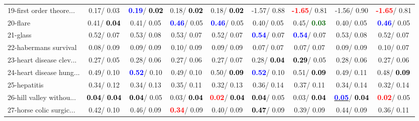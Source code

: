 \begin{table}[h]
\begin{center}
\begin{tabular}{lc|c|c|c|c|c|c|c}
19-first order theore... &   0.17/  0.03 & \textcolor{blue}{\textbf{  0.19}}/\textcolor{black}{\textbf{  0.02}} &   0.18/\textcolor{black}{\textbf{  0.02}} &   0.18/\textcolor{black}{\textbf{  0.02}} &  -1.57/  0.88 & \textcolor{red}{\textbf{ -1.65}}/  0.81 &  -1.56/  0.90 & \textcolor{red}{\textbf{ -1.65}}/  0.81 \\
20-flare &   0.41/\textcolor{black}{\textbf{  0.04}} &   0.41/  0.05 & \textcolor{blue}{\textbf{  0.46}}/  0.05 & \textcolor{blue}{\textbf{  0.46}}/  0.05 &   0.40/  0.05 &   0.45/\textcolor{darkgreen}{\textbf{  0.03}} &   0.40/  0.05 & \textcolor{blue}{\textbf{  0.46}}/  0.05 \\
21-glass &   0.52/  0.07 &   0.53/  0.08 &   0.53/  0.07 &   0.52/  0.07 & \textcolor{blue}{\textbf{  0.54}}/  0.07 & \textcolor{blue}{\textbf{  0.54}}/  0.07 &   0.53/  0.08 &   0.52/  0.07 \\ \hline
22-habermans survival &   0.08/  0.09 &   0.09/  0.09 &   0.10/  0.09 &   0.09/  0.09 &   0.07/  0.07 &   0.07/  0.07 &   0.09/  0.09 &   0.10/  0.07 \\
23-heart disease clev... &   0.27/  0.05 &   0.28/  0.06 &   0.27/  0.06 &   0.27/  0.07 &   0.28/\textcolor{black}{\textbf{  0.04}} & \textcolor{black}{\textbf{  0.29}}/  0.05 &   0.28/  0.06 &   0.27/  0.06 \\
24-heart disease hung... &   0.49/  0.10 & \textcolor{blue}{\textbf{  0.52}}/  0.10 &   0.49/  0.10 &   0.50/\textcolor{black}{\textbf{  0.09}} & \textcolor{blue}{\textbf{  0.52}}/  0.10 &   0.51/\textcolor{black}{\textbf{  0.09}} &   0.49/  0.11 &   0.48/\textcolor{black}{\textbf{  0.09}} \\
25-hepatitis &   0.34/  0.12 &   0.34/  0.13 &   0.35/  0.11 &   0.32/  0.13 &   0.36/  0.14 &   0.37/  0.11 &   0.34/  0.14 &   0.32/  0.14 \\
26-hill valley withou... & \textcolor{black}{\textbf{  0.04}}/\textcolor{black}{\textbf{  0.04}} & \textcolor{black}{\textbf{  0.04}}/  0.05 &   0.03/\textcolor{black}{\textbf{  0.04}} & \textcolor{red}{\textbf{  0.02}}/\textcolor{black}{\textbf{  0.04}} & \textcolor{black}{\textbf{  0.04}}/  0.05 &   0.03/\textcolor{black}{\textbf{  0.04}} & \underline{\textcolor{blue}{\textbf{  0.05}}}/\textcolor{black}{\textbf{  0.04}} & \textcolor{red}{\textbf{  0.02}}/  0.05 \\
27-horse colic surgic... &   0.42/  0.10 &   0.46/  0.09 & \textcolor{red}{\textbf{  0.34}}/  0.09 &   0.40/  0.09 & \textcolor{black}{\textbf{  0.47}}/  0.09 &   0.39/  0.09 &   0.44/  0.09 &   0.36/  0.11 \\

\end{tabular}
\end{center}
\end{table}
